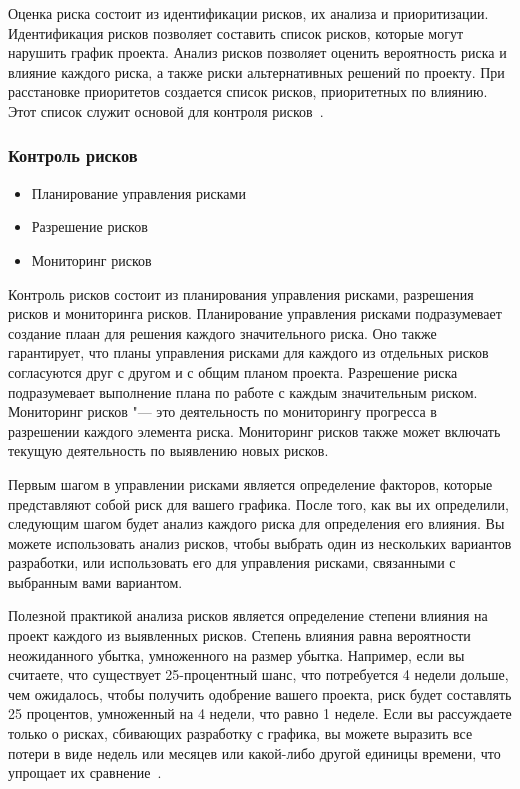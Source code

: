 \documentclass{../industrial-development}
\begin{document}
\lecturenotes

Оценка риска состоит из идентификации рисков, их анализа и приоритизации. Идентификация рисков позволяет составить список рисков, которые могут нарушить график проекта. Анализ рисков позволяет оценить вероятность риска и влияние каждого риска, а также риски альтернативных решений по проекту. При расстановке приоритетов создается список рисков, приоритетных по влиянию. Этот
список служит основой для контроля рисков~\cite[с.~81]{McConnell}.

\begin{frame} \frametitle{Контроль рисков}
	\begin{itemize}
		\item Планирование управления рисками
		\item Разрешение рисков
		\item Мониторинг рисков
	\end{itemize}
\end{frame}

\lecturenotes

Контроль рисков состоит из планирования управления рисками, разрешения рисков и мониторинга рисков. Планирование управления рисками подразумевает создание плаан для решения каждого значительного риска. Оно также гарантирует, что планы управления рисками для каждого из отдельных рисков согласуются друг с другом и с общим планом проекта. Разрешение риска подразумевает выполнение плана по работе с каждым значительным риском. Мониторинг рисков "--- это деятельность по мониторингу прогресса в разрешении каждого элемента риска. Мониторинг рисков также может включать текущую деятельность по выявлению новых рисков.

Первым шагом в управлении рисками является определение факторов, которые представляют собой риск для вашего графика. После того, как вы их определили, следующим шагом будет анализ каждого риска для определения его влияния. Вы можете использовать анализ рисков, чтобы выбрать один из нескольких вариантов разработки, или использовать его для управления рисками, связанными с выбранным вами вариантом.

Полезной практикой анализа рисков является определение степени влияния на проект каждого из выявленных рисков. Степень влияния равна вероятности неожиданного убытка, умноженного на размер убытка. Например, если вы считаете, что существует 25-процентный шанс, что потребуется 4 недели дольше, чем ожидалось, чтобы получить одобрение вашего проекта, риск будет составлять 25 процентов, умноженный на 4 недели, что равно 1 неделе. Если вы рассуждаете только о рисках, сбивающих разработку с графика, вы можете выразить все потери в виде недель или месяцев или какой-либо другой единицы времени, что упрощает их сравнение~\cite[с.~82--83]{McConnell}.
\end{document}
